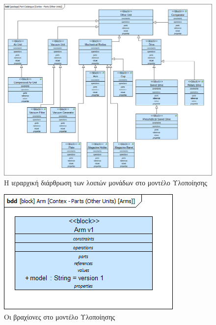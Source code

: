 \documentclass[a4paper,12pt,twoside]{report}
\begin{document}
{\begin{appendices}
				\begin{figure}[hp]
					\centering
					\includegraphics[scale=0.30]{DesignModel_Contex-Parts(OtherUnits).png}
					\caption{Η ιεραρχική διάρθρωση των λοιπών μονάδων στο μοντέλο Υλοποίησης}
					\label{φωτ:Η ιεραρχική διάρθρωσητων λοιπών μονάδων στο μοντέλο Υλοποίησης}
				\end{figure}
				
				\begin{figure}[hp]
					\centering
					\includegraphics[scale=0.50]{DesignModel_Contex-Parts(OtherUnits)[Arms].png}
					\caption{Οι βραχίονες στο μοντέλο Υλοποίησης}
					\label{φωτ:Οι βραχίονες στο μοντέλο Υλοποίησης}
				\end{figure}
				

\end{appendices}}
\end{document}
